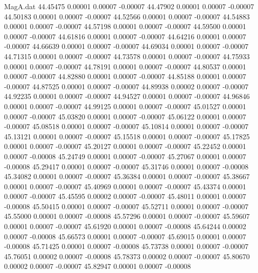 \begin{filecontents}{MagA.dat}
  44.45475    0.00001    0.00007   -0.00007
  44.47902    0.00001    0.00007   -0.00007
  44.50183    0.00001    0.00007   -0.00007
  44.52566    0.00001    0.00007   -0.00007
  44.54883    0.00001    0.00007   -0.00007
  44.57198    0.00001    0.00007   -0.00007
  44.59500    0.00001    0.00007   -0.00007
  44.61816    0.00001    0.00007   -0.00007
  44.64216    0.00001    0.00007   -0.00007
  44.66639    0.00001    0.00007   -0.00007
  44.69034    0.00001    0.00007   -0.00007
  44.71315    0.00001    0.00007   -0.00007
  44.73578    0.00001    0.00007   -0.00007
  44.75933    0.00001    0.00007   -0.00007
  44.78191    0.00001    0.00007   -0.00007
  44.80537    0.00001    0.00007   -0.00007
  44.82880    0.00001    0.00007   -0.00007
  44.85188    0.00001    0.00007   -0.00007
  44.87525    0.00001    0.00007   -0.00007
  44.89938    0.00002    0.00007   -0.00007
  44.92235    0.00001    0.00007   -0.00007
  44.94527    0.00001    0.00007   -0.00007
  44.96846    0.00001    0.00007   -0.00007
  44.99125    0.00001    0.00007   -0.00007
  45.01527    0.00001    0.00007   -0.00007
  45.03820    0.00001    0.00007   -0.00007
  45.06122    0.00001    0.00007   -0.00007
  45.08518    0.00001    0.00007   -0.00007
  45.10814    0.00001    0.00007   -0.00007
  45.13121    0.00001    0.00007   -0.00007
  45.15518    0.00001    0.00007   -0.00007
  45.17825    0.00001    0.00007   -0.00007
  45.20127    0.00001    0.00007   -0.00007
  45.22452    0.00001    0.00007   -0.00008
  45.24749    0.00001    0.00007   -0.00007
  45.27067    0.00001    0.00007   -0.00008
  45.29417    0.00001    0.00007   -0.00007
  45.31746    0.00001    0.00007   -0.00008
  45.34082    0.00001    0.00007   -0.00007
  45.36384    0.00001    0.00007   -0.00007
  45.38667    0.00001    0.00007   -0.00007
  45.40969    0.00001    0.00007   -0.00007
  45.43374    0.00001    0.00007   -0.00007
  45.45595    0.00002    0.00007   -0.00007
  45.48011    0.00001    0.00007   -0.00008
  45.50415    0.00001    0.00007   -0.00007
  45.52711    0.00001    0.00007   -0.00007
  45.55000    0.00001    0.00007   -0.00008
  45.57296    0.00001    0.00007   -0.00007
  45.59607    0.00001    0.00007   -0.00007
  45.61920    0.00001    0.00007   -0.00008
  45.64244    0.00002    0.00007   -0.00008
  45.66573    0.00001    0.00007   -0.00007
  45.69015    0.00001    0.00007   -0.00008
  45.71425    0.00001    0.00007   -0.00008
  45.73738    0.00001    0.00007   -0.00007
  45.76051    0.00002    0.00007   -0.00008
  45.78373    0.00002    0.00007   -0.00007
  45.80670    0.00002    0.00007   -0.00007
  45.82947    0.00001    0.00007   -0.00008

\end{filecontents}
